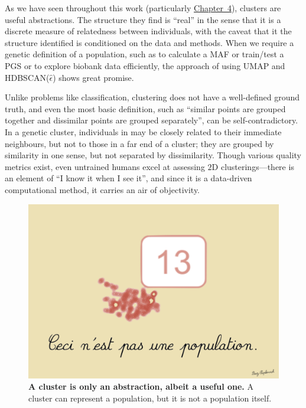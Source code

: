 As we have seen throughout this work (particularly \hyperref[chap:chapter4]{Chapter~4}), clusters are useful abstractions. The structure they find is ``real'' in the sense that it is a discrete measure of relatedness between individuals, with the caveat that it the structure identified is conditioned on the data and methods. When we require a genetic definition of a population, such as to calculate a MAF or train/test a PGS or to explore biobank data efficiently, the approach of using UMAP and HDBSCAN($\hat{\epsilon}$) shows great promise.

Unlike problems like classification, clustering does not have a well-defined ground truth, and even the most basic definition, such as ``similar points are grouped together and dissimilar points are grouped separately'', can be self-contradictory\citep{ben-david_clustering_2018}. In a genetic cluster, individuals in may be closely related to their immediate neighbours, but not to those in a far end of a cluster; they are grouped by similarity in one sense, but not separated by dissimilarity. Though various quality metrics exist, even untrained humans excel at assessing $2$D clusterings\citep{lewis_human_2012}---there is an element of ``I know it when I see it'', and since it is a data-driven computational method, it carries an air of objectivity. %


\begin{figure}[h]
\centering
    \includegraphics[width=0.75\linewidth]{main_figures/discussion/magritte.png}
\caption[The treachery of clustering]{\textbf{A cluster is only an abstraction, albeit a useful one.} A cluster can represent a population, but it is not a population itself.}
\label{fig:magritte}
\end{figure}

